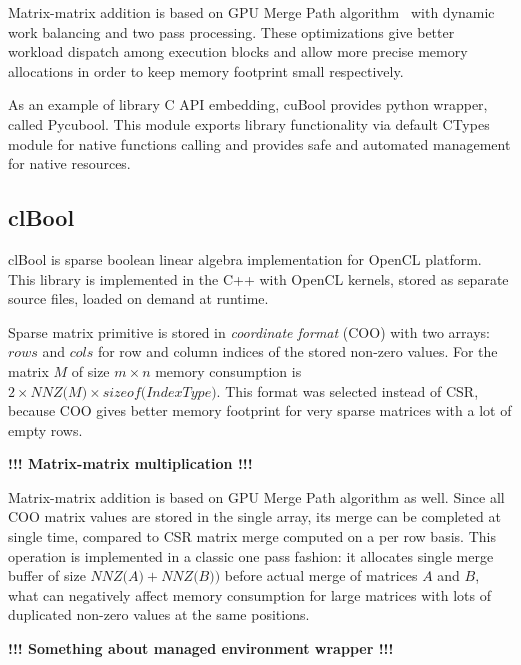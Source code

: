 Matrix-matrix addition is based on GPU Merge Path algorithm~\cite{inproceedings:gpu_merge_path} with 
dynamic work balancing and two pass processing. 
These optimizations give better workload dispatch among execution blocks and allow more precise memory allocations in
order to keep memory footprint small respectively. 

As an example of library C API embedding, cuBool provides python wrapper, called Pycubool. This module exports 
library functionality via default CTypes module for native functions calling and provides safe and automated 
management for native resources. 

\subsection{clBool}

clBool is sparse boolean linear algebra implementation for OpenCL platform. This library is implemented 
in the C++ with OpenCL kernels, stored as separate source files, loaded on demand at runtime. 

Sparse matrix primitive is stored in \textit{coordinate format} (COO) with two arrays: $rows$ and $cols$ 
for row and column indices of the stored non-zero values. For the matrix $M$ of size $m \times n$ memory 
consumption is $2 \times \textit{NNZ(M)} \times \textit{sizeof(IndexType)}$. This format was selected 
instead of CSR, because COO gives better memory footprint for very sparse matrices with a lot of empty rows.

\textbf{!!! Matrix-matrix multiplication !!!}

Matrix-matrix addition is based on GPU Merge Path algorithm as well. Since all COO matrix values are stored in 
the single array, its merge can be completed at single time, compared to CSR matrix merge computed on a 
per row basis. This operation is implemented in a classic one pass fashion: it allocates single merge 
buffer of size $\textit{NNZ(A)} + \textit{NNZ(B)})$ before actual merge of matrices $A$ and $B$, what can
negatively affect memory consumption for large matrices with lots of duplicated non-zero values at the 
same positions.

\textbf{!!! Something about managed environment wrapper !!!}
